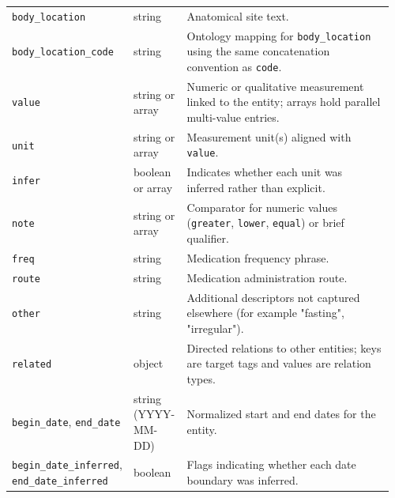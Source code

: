 \begin{longtable}{@{}p{0.26\linewidth}p{0.14\linewidth}p{0.56\linewidth}@{}}
\texttt{body\_location} & string & Anatomical site text. \\
\texttt{body\_location\_code} & string & Ontology mapping for \texttt{body\_location} using the same concatenation convention as \texttt{code}. \\
\texttt{value} & string or array & Numeric or qualitative measurement linked to the entity; arrays hold parallel multi-value entries. \\
\texttt{unit} & string or array & Measurement unit(s) aligned with \texttt{value}. \\
\texttt{infer} & boolean or array & Indicates whether each unit was inferred rather than explicit. \\
\texttt{note} & string or array & Comparator for numeric values (\texttt{greater}, \texttt{lower}, \texttt{equal}) or brief qualifier. \\
\texttt{freq} & string & Medication frequency phrase. \\
\texttt{route} & string & Medication administration route. \\
\texttt{other} & string & Additional descriptors not captured elsewhere (for example "fasting", "irregular"). \\
\texttt{related} & object & Directed relations to other entities; keys are target tags and values are relation types. \\
\texttt{begin\_date}, \texttt{end\_date} & string (YYYY-MM-DD) & Normalized start and end dates for the entity. \\
\texttt{begin\_date\_inferred}, \texttt{end\_date\_inferred} & boolean & Flags indicating whether each date boundary was inferred. \\
\bottomrule
\end{longtable}
